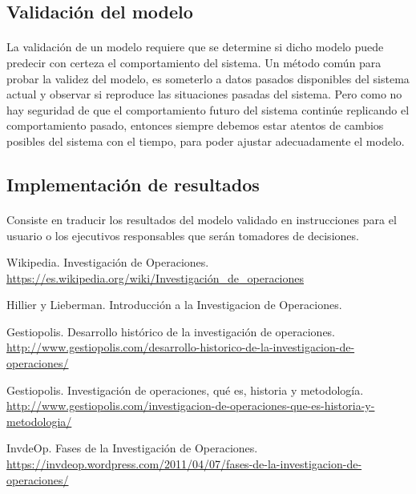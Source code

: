 \documentclass[12pt, a4paper,spanish]{article}
\begin{document}
		\subsection{Validación del modelo}

			\paragraph{}
			La validación de un modelo requiere que se determine si dicho modelo puede predecir con certeza el comportamiento del sistema. Un método común para probar la validez del modelo, es someterlo a datos pasados disponibles del sistema actual y observar si reproduce las situaciones pasadas del sistema. Pero como no hay seguridad de que el comportamiento futuro del sistema continúe replicando el comportamiento pasado, entonces siempre debemos estar atentos de cambios posibles del sistema con el tiempo, para poder ajustar adecuadamente el modelo.\cite{invdeop_IO}

		\subsection{Implementación de resultados}

			\paragraph{}
			Consiste en traducir los resultados del modelo validado en instrucciones para el usuario o los ejecutivos responsables que serán tomadores de decisiones.\cite{invdeop_IO}


	\begin{thebibliography}{9}

		Wikipedia. Investigación de Operaciones. \\
		\url{https://es.wikipedia.org/wiki/Investigación_de_operaciones}

		Hillier y Lieberman. Introducción a la Investigacion de Operaciones.

		Gestiopolis. Desarrollo histórico de la investigación de operaciones. \\
		\url{http://www.gestiopolis.com/desarrollo-historico-de-la-investigacion-de-operaciones/}

		Gestiopolis. Investigación de operaciones, qué es, historia y metodología. \\
		\url{http://www.gestiopolis.com/investigacion-de-operaciones-que-es-historia-y-metodologia/}

		InvdeOp. Fases de la Investigación de Operaciones. \\
		\url{https://invdeop.wordpress.com/2011/04/07/fases-de-la-investigacion-de-operaciones/}

	\end{thebibliography}
\end{document}
